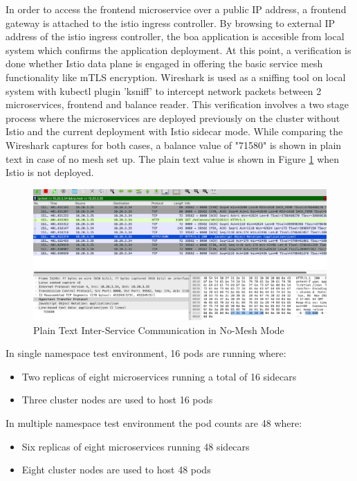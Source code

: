 In order to access the frontend microservice over a public IP address, a frontend gateway is attached to the istio ingress controller. By browsing to external IP address of the istio ingress controller, the \acrshort{boa} application is accesible from local system which confirms the application deployment. At this point, a verification is done whether Istio data plane is engaged in offering the basic service mesh functionality like mTLS encryption. Wireshark is used as a sniffing tool on local system with kubectl plugin 'ksniff' to intercept network packets between 2 microservices, frontend and balance reader. This verification involves a two stage process where the microservices are deployed previously on the cluster without Istio and the current deployment with Istio sidecar mode. While comparing the Wireshark captures for both cases, a balance value of "71580" is shown in plain text in case of no mesh set up. The plain text value is shown in Figure \ref{method:plainTxtWiresharkView} when Istio is not deployed.

\begin{figure}[ht!]
    \centering
    \includegraphics[width=1.0\linewidth]{resources/raw-balance-value.png}
    \caption{Plain Text Inter-Service Communication in No-Mesh Mode}
    \label{method:plainTxtWiresharkView}
\end{figure}

In single namespace test environment, 16 pods are running where:
\begin{itemize}
  \item Two replicas of eight microservices running a total of 16 sidecars
  \item Three cluster nodes are used to host 16 pods
\end{itemize}

In multiple namespace test environment the pod counts are 48 where:
\begin{itemize}
  \item Six replicas of eight microservices running 48 sidecars
  \item Eight cluster nodes are used to host 48 pods
\end{itemize}


